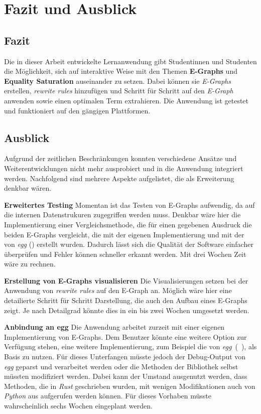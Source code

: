 \section{Fazit und Ausblick}\label{sec:fazit}

\subsection{Fazit}

Die in dieser Arbeit entwickelte Lernanwendung gibt Studentinnen und Studenten die Möglichkeit, sich auf interaktive Weise mit den Themen \textbf{E-Graphs} und 
\textbf{Equality Saturation} auseinander zu setzen. Dabei können sie \textit{E-Graphs} erstellen, \textit{rewrite rules} hinzufügen und Schritt für Schritt 
auf den \textit{E-Graph} anwenden sowie einen optimalen Term extrahieren. Die Anwendung ist getestet und funktioniert auf den gängigen Plattformen.

\subsection{Ausblick}

Aufgrund der zeitlichen Beschränkungen konnten verschiedene Ansätze und Weiterentwicklungen nicht mehr ausprobiert und in die Anwendung integriert werden.
Nachfolgend sind mehrere Aspekte aufgelistet, die als Erweiterung denkbar wären. 

\textbf{Erweitertes Testing} Momentan ist das Testen von E-Graphs aufwendig, da auf die internen Datenstrukuren zugegriffen werden muss.
Denkbar wäre hier die Implementierung einer Vergleichsmethode, die für einen gegebenen Ausdruck die beiden E-Graphs vergleicht,
die mit der eigenen Implementierung und mit der von \textit{egg} (\cite{2021-egg}) erstellt wurden. 
Dadurch lässt sich die Qualität der Software einfacher überprüfen und Fehler können schneller erkannt werden.
Mit drei Wochen Zeit wäre zu rechnen.

\textbf{Erstellung von E-Graphs visualisieren} Die Visualisierungen setzen bei der Anwendung von \textit{rewrite rules} auf den E-Graph an.
Möglich wäre hier eine detailierte Schritt für Schritt Darstellung, die auch den Aufbau eines E-Graphs zeigt. Je nach Detailgrad könnte dies in ein bis zwei Wochen umgesetzt werden.

\textbf{Anbindung an egg} Die Anwendung arbeitet zurzeit mit einer eigenen Implementierung von E-Graphs. Dem Benutzer könnte eine weitere Option zur Verfügung stehen, eine weitere
Implementierung, zum Beispiel die von \textit{egg}~(~\cite{2021-egg}), als Basis zu nutzen.
Für dieses Unterfangen müsste jedoch der Debug-Output von \textit{egg} geparst und verarbeitet werden oder die Methoden der Bibliothek selbst müssten modifiziert werden.
Dabei kann der Umstand ausgenutzt werden, dass Methoden, die in \textit{Rust} geschrieben wurden, mit wenigen Modifikationen auch von \textit{Python} aus aufgerufen werden können.
Für dieses Vorhaben müsste wahrscheinlich sechs Wochen eingeplant werden.


